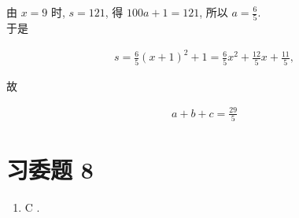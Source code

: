 \documentclass[10pt]{article}
\begin{document}
由 $x=9$ 时, $s=121$, 得 $100 a+1=121$, 所以 $a=\frac{6}{5}$.\\
于是

\begin{align*}
s=\frac{6}{5}(x+1)^{2}+1=\frac{6}{5} x^{2}+\frac{12}{5} x+\frac{11}{5},
\end{align*}

故

\begin{align*}
a+b+c=\frac{29}{5}
\end{align*}

\section*{习委题 8}
\begin{enumerate}
  \item C .
\end{enumerate}
\end{document}
